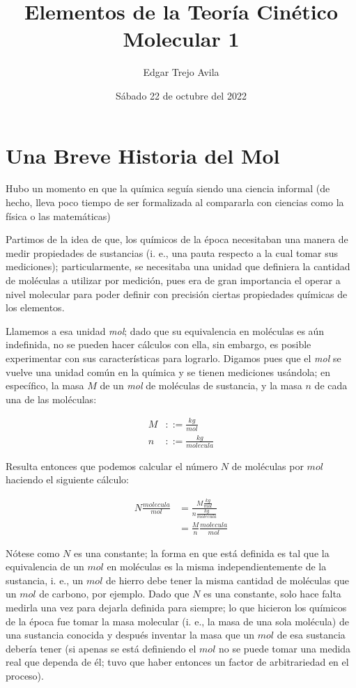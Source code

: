 \documentclass{article}
\title{Elementos de la Teoría Cinético Molecular 1}
\author{Edgar Trejo Avila}
\date{Sábado 22 de octubre del 2022}
\begin{document}
\maketitle

\section*{Una Breve Historia del Mol}

Hubo un momento en que la química seguía siendo una
ciencia informal (de hecho, lleva poco tiempo de ser formalizada
al compararla con ciencias como la física o las matemáticas)

Partimos de la idea de que, los químicos de la época
necesitaban una manera de medir propiedades de sustancias
(i. e., una pauta respecto a la cual tomar sus mediciones);
particularmente, se necesitaba una unidad que definiera
la cantidad de moléculas a utilizar por medición, pues era
de gran importancia el operar a nivel molecular para poder
definir con precisión ciertas propiedades químicas de los elementos.

Llamemos a esa unidad \textit{mol}; dado que su equivalencia
en moléculas es aún indefinida, no se pueden hacer cálculos con
ella, sin embargo, es posible experimentar con sus características
para lograrlo. Digamos pues que el \textit{mol} se vuelve una
unidad común en la química y se tienen mediciones usándola;
en específico, la masa \(M\) de un \textit{mol}
de moléculas de sustancia, y la masa \(n\) de cada una de las moléculas:

\begin{align*}
    M & ::= \frac{kg}{mol}      \\
    n & ::= \frac{kg}{molecula}
\end{align*}

Resulta entonces que podemos calcular el número \(N\) de moléculas por
\(mol\) haciendo el siguiente cálculo:

\begin{align}
    N \frac{molecula}{mol} & = \frac{M \frac{kg}{mol}}{n \frac{kg}{molecula}} \nonumber
    \\
                           & = \frac{M}{n} \frac{molecula}{mol} \label{avogadroEquivalence}
\end{align}

Nótese como \(N\) es una constante; la forma en que está definida
es tal que la equivalencia de un \(mol\) en moléculas es la misma
independientemente de la sustancia, i. e., un \(mol\) de hierro
debe tener la misma cantidad de moléculas que un \(mol\) de carbono,
por ejemplo. Dado que \(N\) es una constante, solo hace falta medirla
una vez para dejarla definida para siempre; lo que hicieron los
químicos de la época fue tomar la masa molecular (i. e., la masa
de una sola molécula) de una sustancia conocida y después inventar
la masa que un \(mol\) de esa sustancia debería tener (si apenas se
está definiendo el \(mol\) no se puede tomar una medida real que
dependa de él; tuvo que haber entonces un factor de arbitrariedad en
el proceso).
\end{document}
